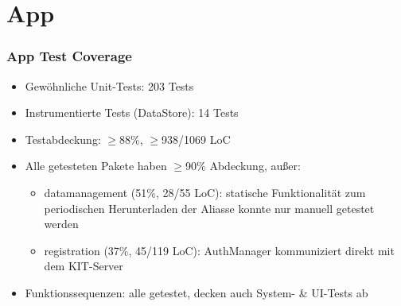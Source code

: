 \section{App}

\begin{frame}\frametitle{App Test Coverage}
    \begin{itemize}
        \item Gewöhnliche Unit-Tests: 203 Tests
        \item Instrumentierte Tests (DataStore): 14 Tests
        \item Testabdeckung: $\geq$88\%, $\geq$938/1069 LoC
        \item Alle getesteten Pakete haben $\geq$90\% Abdeckung, außer: 
        \begin{itemize}
            \item datamanagement (51\%, 28/55 LoC): statische Funktionalität zum periodischen Herunterladen der Aliasse konnte nur manuell getestet werden
            \item registration (37\%, 45/119 LoC): AuthManager kommuniziert direkt mit dem KIT-Server    
        \end{itemize}
        \item Funktionssequenzen: alle getestet, decken auch System- \& UI-Tests ab
        \end{itemize}
\end{frame}